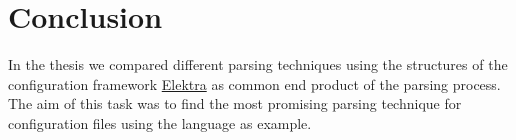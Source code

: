 \chapter{Conclusion}

%
%
%
%
%
%
%
%

In the thesis we compared different parsing techniques using the  structures of the configuration framework \href{https://www.libelektra.org}{Elektra} as common end product of the parsing process. The aim of this task was to find the most promising parsing technique for configuration files using the language  as example.
